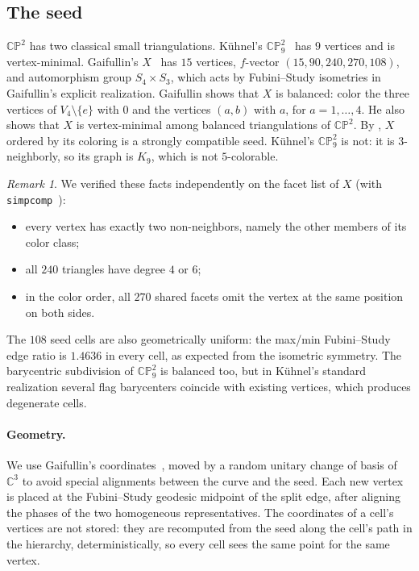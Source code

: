 \documentclass[11pt]{article}
\theoremstyle{plain}
\theoremstyle{definition}
\theoremstyle{remark}
\newtheorem{remark}[theorem]{Remark}
\newcommand{\CP}{\mathbb{CP}}
\newcommand{\C}{\mathbb{C}}
\begin{document}
\subsection{The seed}
\label{sec:cp2}

$\CP^2$ has two classical small triangulations. Kühnel's
$\CP^2_9$~\cite{kuhnelbanchoff1983} has $9$ vertices and is vertex-minimal.
Gaifullin's $X$~\cite{gaifullin2009} has $15$ vertices, $f$-vector
$(15,90,240,270,108)$, and automorphism group $S_4\times S_3$, which acts
by Fubini--Study isometries in Gaifullin's explicit realization.
Gaifullin shows that $X$ is balanced: color the three vertices of
$V_4\setminus\{e\}$ with $0$ and the vertices $(a,b)$ with $a$, for
$a=1,\dots,4$. He also shows that $X$ is vertex-minimal among balanced
triangulations of $\CP^2$. By , $X$ ordered by its
coloring is a strongly compatible seed. Kühnel's $\CP^2_9$ is not: it is
$3$-neighborly, so its graph is $K_9$, which is not $5$-colorable.

\begin{remark}
We verified these facts independently on the facet list of $X$ (with
\texttt{simpcomp}~\cite{simpcomp}):
\begin{itemize}[itemsep=1pt]
\item every vertex has exactly two non-neighbors, namely the other members
  of its color class;
\item all $240$ triangles have degree $4$ or $6$;
\item in the color order, all $270$ shared facets omit the vertex at the
  same position on both sides.
\end{itemize}
The $108$ seed cells are also geometrically uniform: the max/min
Fubini--Study edge ratio is $1.4636$ in every cell, as expected from the
isometric symmetry. The barycentric subdivision of $\CP^2_9$ is balanced
too, but in Kühnel's standard realization several flag barycenters
coincide with existing vertices, which produces degenerate cells.
\end{remark}

\paragraph{Geometry.}
We use Gaifullin's coordinates~\cite{gaifullin2009}, moved by a random
unitary change of basis of $\C^3$ to avoid special alignments between the
curve and the seed. Each new vertex is placed at the Fubini--Study
geodesic midpoint of the split edge, after aligning the phases of the two
homogeneous representatives. The coordinates of a cell's vertices are
not stored: they are recomputed from the seed along the cell's path in
the hierarchy, deterministically, so every cell sees the same point for
the same vertex.
\end{document}
